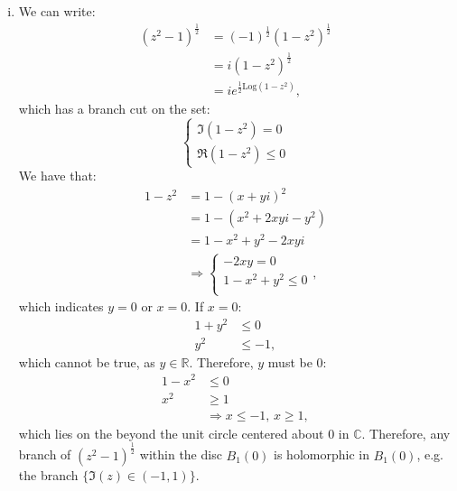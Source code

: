 \documentclass[a4paper, titlepage, DIV=14]{scrartcl}
\newcommand{\Log}{\text{Log}}
\begin{document}
\begin{enumerate}[(i)]
        \item We can write:
        \begin{align*}
            (z^{2}-1)^{\frac{1}{2}} &= (-1)^{\frac{1}{2}}(1-z^{2})^{\frac{1}{2}} \\
                &= i(1-z^{2})^{\frac{1}{2}} \\
                &= ie^{\frac{1}{2}\Log(1-z^{2})},
        \end{align*}which has a branch cut on the set:
        \[
          \begin{cases}
              \Im(1-z^{2}) = 0 \\
              \Re(1-z^{2}) \leq 0
          \end{cases}  
        \]
        We have that:
        \begin{align*}
            1-z^{2} &= 1 - (x+yi)^{2} \\
                &= 1 - (x^{2}+2xyi-y^{2}) \\
                &= 1 - x^{2} + y^{2} - 2xyi \\
                &\Rightarrow \begin{cases}
                    -2xy = 0 \\
                    1 - x^{2} + y^{2} \leq 0 \\
                \end{cases},
        \end{align*}which indicates $y=0$ or $x=0$. If $x=0$:
        \begin{align*}
            1 + y^{2} &\leq 0 \\
            y^{2} &\leq -1,
        \end{align*} which cannot be true, as $y\in \mathbb{R}$. Therefore, $y$ must be 0:
        \begin{align*}
            1-x^{2} &\leq 0 \\
            x^{2} &\geq 1 \\
            &\Rightarrow x \leq -1, \, x \geq 1,
        \end{align*}which lies on the beyond the unit circle centered about 0 in $\mathbb{C}$. Therefore,
        any branch of $(z^{2}-1)^{\frac{1}{2}}$ within the disc $B_{1}(0)$ is holomorphic in $B_{1}(0)$,
        e.g. the branch $\{\Im(z)\in (-1, 1)\}$.
    \end{enumerate}
\end{document}
